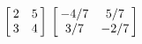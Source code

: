 {$\left[\hskip -3pt \begin{array}{cc} 2&5\\  3&4\end {array} \hskip -3pt
 \right] $
 }
{$\left[\hskip -3pt \begin{array}{cc} -4/7&5/7\\  3/7&-2/7\end {array} \hskip -3pt
 \right]$ }
